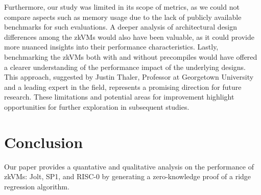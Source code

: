 \documentclass{scrartcl}
\begin{document}
Furthermore, our study was limited in its scope of metrics, as we could not compare aspects such as memory usage due to the lack of publicly available benchmarks for such evaluations. A deeper analysis of architectural design differences among the zkVMs would also have been valuable, as it could provide more nuanced insights into their performance characteristics. Lastly, benchmarking the zkVMs both with and without precompiles would have offered a clearer understanding of the performance impact of the underlying designs. This approach, suggested by Justin Thaler, Professor at Georgetown University and a leading expert in the field, represents a promising direction for future research. These limitations and potential areas for improvement highlight opportunities for further exploration in subsequent studies.
%
%
%
%

\section{Conclusion}

Our paper\cite{zkbenchmark} provides a quantative and qualitative analysis on the performance of zkVMs: Jolt, SP1, and RISC-0 by generating a zero-knowledge proof of a ridge regression algorithm.
\end{document}
